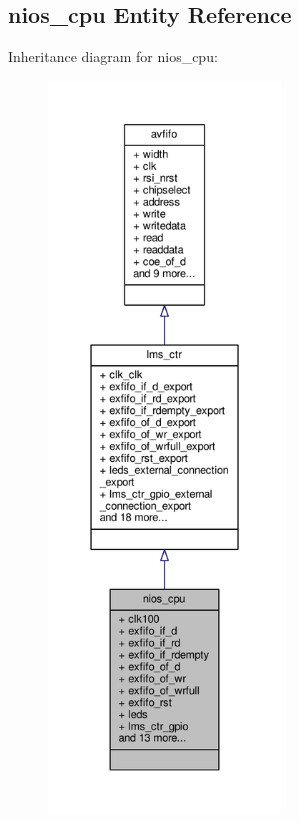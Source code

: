 \subsection{nios\+\_\+cpu Entity Reference}
\label{classnios__cpu}


Inheritance diagram for nios\+\_\+cpu\+:\nopagebreak
\begin{figure}[H]
\begin{center}
\leavevmode
\includegraphics[height=550pt]{de/dc0/classnios__cpu__inherit__graph}
\end{center}
\end{figure}



